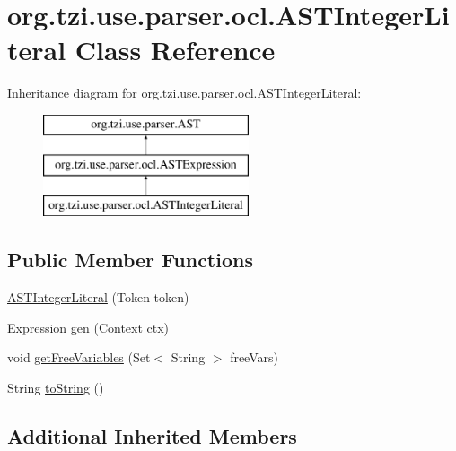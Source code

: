 \hypertarget{classorg_1_1tzi_1_1use_1_1parser_1_1ocl_1_1_a_s_t_integer_literal}{\section{org.\-tzi.\-use.\-parser.\-ocl.\-A\-S\-T\-Integer\-Literal Class Reference}
\label{classorg_1_1tzi_1_1use_1_1parser_1_1ocl_1_1_a_s_t_integer_literal}
}
Inheritance diagram for org.\-tzi.\-use.\-parser.\-ocl.\-A\-S\-T\-Integer\-Literal\-:\begin{figure}[H]
\begin{center}
\leavevmode
\includegraphics[height=3.000000cm]{classorg_1_1tzi_1_1use_1_1parser_1_1ocl_1_1_a_s_t_integer_literal}
\end{center}
\end{figure}
\subsection*{Public Member Functions}
\begin{DoxyCompactItemize}
\item 
\hyperlink{classorg_1_1tzi_1_1use_1_1parser_1_1ocl_1_1_a_s_t_integer_literal_ae01ee2b4f0a375c367258753a6f18512}{A\-S\-T\-Integer\-Literal} (Token token)
\item 
\hyperlink{classorg_1_1tzi_1_1use_1_1uml_1_1ocl_1_1expr_1_1_expression}{Expression} \hyperlink{classorg_1_1tzi_1_1use_1_1parser_1_1ocl_1_1_a_s_t_integer_literal_a5c4d3906a5043ef1d120d65c9dd7eabe}{gen} (\hyperlink{classorg_1_1tzi_1_1use_1_1parser_1_1_context}{Context} ctx)
\item 
void \hyperlink{classorg_1_1tzi_1_1use_1_1parser_1_1ocl_1_1_a_s_t_integer_literal_a83e7c8ca5faa0ca371e8cd42b0bb9c59}{get\-Free\-Variables} (Set$<$ String $>$ free\-Vars)
\item 
String \hyperlink{classorg_1_1tzi_1_1use_1_1parser_1_1ocl_1_1_a_s_t_integer_literal_a9aa4db9564fd98187418be65ab8567bf}{to\-String} ()
\end{DoxyCompactItemize}
\subsection*{Additional Inherited Members}


